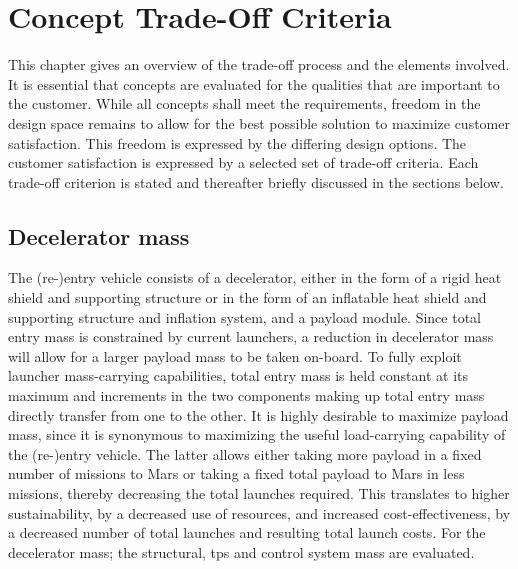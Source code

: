 \section{Concept Trade-Off Criteria}\label{ch:tradeoff}
This chapter gives an overview of the trade-off process and the elements involved. It is essential that concepts are evaluated for the qualities that are important to the customer. While all concepts shall meet the requirements, freedom in the design space remains to allow for the best possible solution to maximize customer satisfaction. This freedom is expressed by the differing design options. The customer satisfaction is expressed by a selected set of trade-off criteria. Each trade-off criterion is stated and thereafter briefly discussed in the sections below.

\subsection{Decelerator mass}\label{subsub:decelmass}
The (re-)entry vehicle consists of a decelerator, either in the form of a rigid heat shield and supporting structure or in the form of an inflatable heat shield and supporting structure and inflation system, and a payload module. Since total entry mass is constrained by current launchers, a reduction in decelerator mass will allow for a larger payload mass to be taken on-board. To fully exploit launcher mass-carrying capabilities, total entry mass is held constant at its maximum and increments in the two components making up total entry mass directly transfer from one to the other. It is highly desirable to maximize payload mass, since it is synonymous to maximizing the useful load-carrying capability of the (re-)entry vehicle. The latter allows either taking more payload in a fixed number of missions to Mars or taking a fixed total payload to Mars in less missions, thereby decreasing the total launches required. This translates to higher sustainability, by a decreased use of resources, and increased cost-effectiveness, by a decreased number of total launches and resulting total launch costs. For the decelerator mass; the structural, \gls{tps} and control system mass are evaluated.

